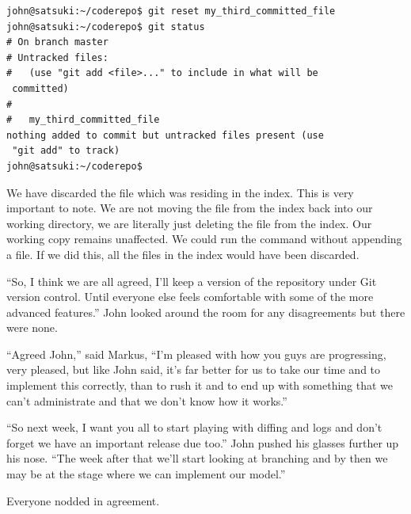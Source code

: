 \begin{Verbatim}
john@satsuki:~/coderepo$ git reset my_third_committed_file
john@satsuki:~/coderepo$ git status
# On branch master
# Untracked files:
#   (use "git add <file>..." to include in what will be
 committed)
#
#	my_third_committed_file
nothing added to commit but untracked files present (use
 "git add" to track)
john@satsuki:~/coderepo$
\end{Verbatim}

We have discarded the file which was residing in the index.
This is very important to note.
We are not moving the file from the index back into our working directory, we are literally just deleting the file from the index.
Our working copy remains unaffected.
We could run the  command without appending a file.
If we did this, all the files in the index would have been discarded.

\begin{trenches}
``So, I think we are all agreed, I'll keep a version of the repository under Git version control.
Until everyone else feels comfortable with some of the more advanced features.'' John looked around the room for any disagreements but there were none.

``Agreed John,'' said Markus, ``I'm pleased with how you guys are progressing, very pleased, but like John said, it's far better for us to take our time and to implement this correctly, than to rush it and to end up with something that we can't administrate and that we don't know how it works.''

``So next week, I want you all to start playing with diffing and logs and don't forget we have an important release due too.'' John pushed his glasses further up his nose.
``The week after that we'll start looking at branching and by then we may be at the stage where we can implement our model.''

Everyone nodded in agreement.
\end{trenches}


